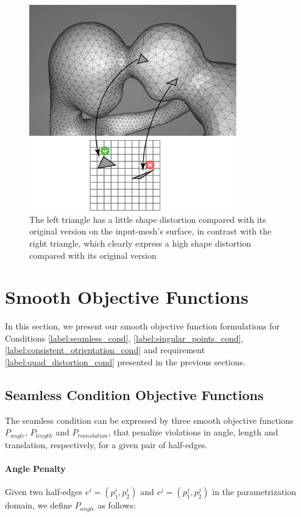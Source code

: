 \begin{figure}[ht]
\centering
\includegraphics[width=9cm]{figures/distortion/distortion.png}
\caption[The Orientation Requirement]{The left triangle has a little shape distortion compared with its original version on the input-mesh's surface, in contrast with the right triangle, which clearly express a high shape distortion compared with its original version}
\label{fig:distortion_req}
\end{figure}

\section{Smooth Objective Functions}
In this section, we present our smooth objective function formulations for Conditions \ref{label:seamless_cond}, \ref{label:singular_points_cond}, \ref{label:consistent_otrientation_cond} and requirement \ref{label:quad_distortion_cond} presented in the previous sections.

\subsection{Seamless Condition Objective Functions}
The seamless condition can be expressed by three smooth objective functions $P_{angle}$, $P_{length}$ and $P_{translation}$, that penalize violations in angle, length and translation, respectively, for a given pair of half-edges.

\paragraph{Angle Penalty}
Given two half-edges $e^i = \left(p^i_1,p^i_2\right)$ and $e^j = \left(p^j_1,p^j_2\right)$ in the parametrization domain, we define $P_{angle}$ as follows:

